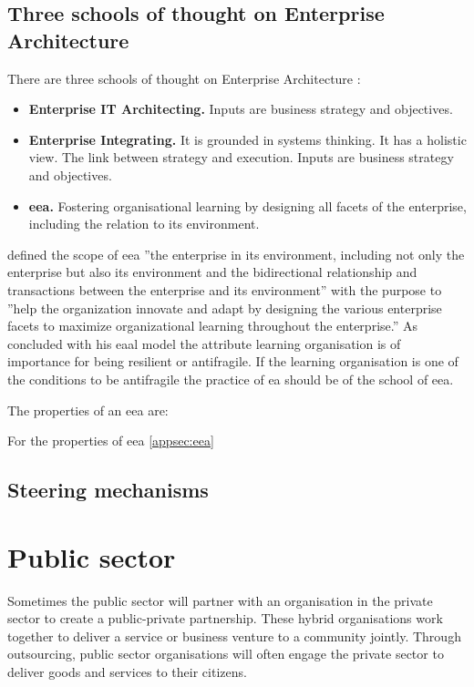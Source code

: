 \subsection{Three schools of thought on Enterprise Architecture}
\label{sub:eathreeschools}
There are three schools of thought on Enterprise Architecture \parencite{Lapalme2012}:
\begin{itemize}
	\item{\textbf{Enterprise IT Architecting.} Inputs are business strategy and objectives.}
	\item{\textbf{Enterprise Integrating.} It is grounded in systems thinking. It has a holistic view. The link between strategy and execution. Inputs are business strategy and objectives.}
	\item{\textbf{\acrfull{eea}.} Fostering organisational learning by designing all facets of the enterprise, including the relation to its environment.}
\end{itemize}

 \textcite{Lapalme2012} defined the scope of \acrshort{eea} ''the enterprise in its environment, including not only the enterprise but also its environment and the bidirectional relationship and transactions between the enterprise and its environment'' with the purpose to ''help the organization innovate and adapt by designing the various enterprise facets to maximize organizational learning throughout the enterprise.'' As \textcite{Botjes2020} concluded with his \acrshort{eaal} model the attribute learning organisation is of importance for being \gls{resilient} or \gls{antifragile}. If the learning organisation is one of the conditions to be \gls{antifragile} the practice of \acrshort{ea} should be of the school of \acrshort{eea}. 

The properties of an \acrshort{eea} are:

For the properties of \acrshort{eea} \cref{appsec:eea}

\subsection{Steering mechanisms}
\label{sub:tbeasteering}

\section{Public sector}
\label{sec:tbpsmarket}
Sometimes the public sector will partner with an organisation in the private sector to create a public-private partnership. These hybrid organisations work together to deliver a service or business venture to a community jointly. Through outsourcing, public sector organisations will often engage the private sector to deliver goods and services to their citizens. 

